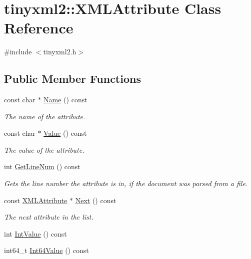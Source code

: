 \hypertarget{classtinyxml2_1_1_x_m_l_attribute}{}\section{tinyxml2\+:\+:X\+M\+L\+Attribute Class Reference}
\label{classtinyxml2_1_1_x_m_l_attribute}


{\ttfamily \#include $<$tinyxml2.\+h$>$}

\subsection*{Public Member Functions}
\begin{DoxyCompactItemize}
\item 
const char $\ast$ \mbox{\hyperlink{classtinyxml2_1_1_x_m_l_attribute_a5a5c135d24cce7abda6f17301c6274d8}{Name}} () const
\begin{DoxyCompactList}\small\item\em The name of the attribute. \end{DoxyCompactList}\item 
const char $\ast$ \mbox{\hyperlink{classtinyxml2_1_1_x_m_l_attribute_ab1c5cd993f836a771818ca408994b14e}{Value}} () const
\begin{DoxyCompactList}\small\item\em The value of the attribute. \end{DoxyCompactList}\item 
int \mbox{\hyperlink{classtinyxml2_1_1_x_m_l_attribute_a02d5ea924586e35f9c13857d1671b765}{Get\+Line\+Num}} () const
\begin{DoxyCompactList}\small\item\em Gets the line number the attribute is in, if the document was parsed from a file. \end{DoxyCompactList}\item 
const \mbox{\hyperlink{classtinyxml2_1_1_x_m_l_attribute}{X\+M\+L\+Attribute}} $\ast$ \mbox{\hyperlink{classtinyxml2_1_1_x_m_l_attribute_aee53571b21e7ce5421eb929523a8bbe6}{Next}} () const
\begin{DoxyCompactList}\small\item\em The next attribute in the list. \end{DoxyCompactList}\item 
int \mbox{\hyperlink{classtinyxml2_1_1_x_m_l_attribute_adfa2433f0fdafd5c3880936de9affa80}{Int\+Value}} () const
\item 
int64\+\_\+t \mbox{\hyperlink{classtinyxml2_1_1_x_m_l_attribute_a8762ed54f147c5744ada55c3d04d27f2}{Int64\+Value}} () const

\end{DoxyCompactItemize}
